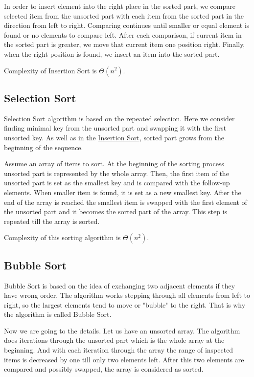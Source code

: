 \documentclass[
  field=inf,
  biblatex,
  language=english,
  glossaries,
  theorems=false,
  sourcecodes=false,
  index
]{kidiplom}
\begin{document}
In order to insert element into the right place in the sorted part, we compare selected item from the unsorted part with each item from the sorted part in the direction from left to right. Comparing continues until smaller or equal element is found or no elements to compare left. After each comparison, if current item in the sorted part is greater, we move that current item one position right. Finally, when the right position is found, we insert an item into the sorted part.

Complexity of Insertion Sort is $\Theta(n^2)$.

\subsection{Selection Sort}
\label{sec:selection}

Selection Sort algorithm is based on the repeated selection. Here we consider finding minimal key from the unsorted part and swapping it with the first unsorted key. As well as in the \hyperref[sec:insertion]{Insertion Sort}, sorted part grows from the beginning of the sequence.

Assume an array of items to sort. At the beginning of the sorting process unsorted part is represented by the whole array. Then, the first item of the unsorted part is set as the smallest key and is compared with the follow-up elements. When smaller item is found, it is set as a new smallest key. After the end of the array is reached the smallest item is swapped with the first element of the unsorted part and it becomes the sorted part of the array. This step is repeated till the array is sorted.

Complexity of this sorting algorithm is $\Theta(n^2)$.

\subsection{Bubble Sort}
\label{sec:bubble}
Bubble Sort is based on the idea of exchanging two adjacent elements if they have wrong order. The algorithm works stepping through all elements from left to right, so the largest elements tend to move or "bubble" to the right. That is why the algorithm is called Bubble Sort.

Now we are going to the details. Let us have an unsorted array. The algorithm does iterations through the unsorted part which is the whole array at the beginning. And with each iteration through the array the range of inspected items is decreased by one till only two elements left. After this two elements are compared and possibly swapped, the array is considered as sorted.
\end{document}
